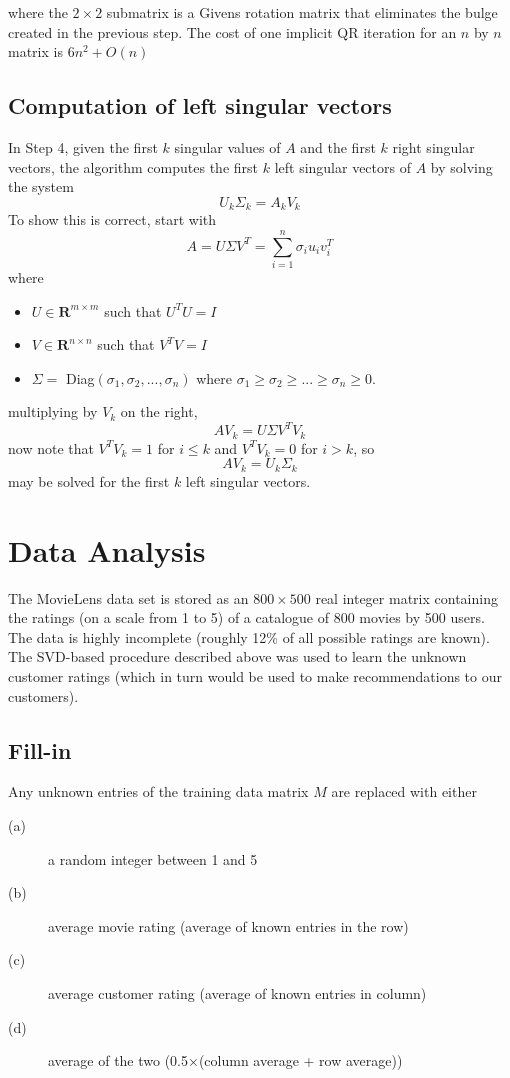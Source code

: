 \documentclass[11pt]{article} %
\begin{document}
where the $2 \times 2$ submatrix is a Givens rotation matrix that eliminates the bulge created in the previous step. The cost of one implicit QR iteration for an $n$ by $n$ matrix is $6n^2 + O(n)$


\subsection{Computation of left singular vectors}
In Step 4, given the first $k$ singular values of $A$ and the first $k$ right singular vectors, the algorithm computes the first $k$ left singular vectors of $A$ by solving the system
\begin{equation}
U_k \Sigma_k  = A_k V_k
\end{equation}
To show this is correct, start with
\begin{equation}
A = U \Sigma V^T = \sum_{i=1}^n \sigma_i u_i v_i^T
\end{equation}
where
\begin{itemize}
\item $U \in \mathbf{R}^{m\times m}$ such that $U^T U = I$
\item $V \in \mathbf{R}^{n\times n}$ such that $V^T V = I$
\item $\Sigma =$ Diag$(\sigma_1, \sigma_2, ... , \sigma_n)$ where $\sigma_1 \ge \sigma_2 \ge ... \ge \sigma_n \ge 0$. 
\end{itemize}
multiplying by $V_k$ on the right,
\begin{equation}
A V_k= U \Sigma V^T V_k
\end{equation}
now note that $V^T V_k = 1$ for $i \le k$ and $V^T V_k = 0$ for $i > k$, so
\begin{equation}
A V_k= U_k \Sigma_k
\end{equation}
may be solved for the first $k$ left singular vectors.

\section{Data Analysis}
The MovieLens data set is stored as an $800 \times 500$ real integer matrix containing the ratings (on
a scale from 1 to 5) of a catalogue of 800 movies by 500 users. The data is highly incomplete (roughly 12\%
of all possible ratings are known). The SVD-based procedure described above was used to learn the unknown customer ratings (which in turn would be used to make recommendations to our customers).

\subsection{Fill-in}
Any unknown entries of the training data matrix $M$ are replaced with either
\begin{description}
  \item[(a)] a random integer between 1 and 5
  \item[(b)] average movie rating (average of known entries in the row)
  \item[(c)] average customer rating (average of known entries in column)
\item[(d)]average of the two (0.5×(column average + row average))
\end{description}
\end{document}
